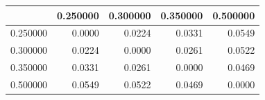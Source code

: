 \begin{tabular}{lrrrr}
\toprule
 & 0.250000 & 0.300000 & 0.350000 & 0.500000 \\
\midrule
0.250000 & 0.0000 & 0.0224 & 0.0331 & 0.0549 \\
0.300000 & 0.0224 & 0.0000 & 0.0261 & 0.0522 \\
0.350000 & 0.0331 & 0.0261 & 0.0000 & 0.0469 \\
0.500000 & 0.0549 & 0.0522 & 0.0469 & 0.0000 \\
\bottomrule
\end{tabular}
